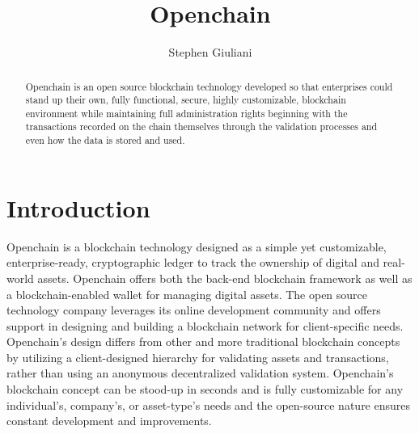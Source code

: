 
\title{Openchain}


\author{Stephen Giuliani}

\renewcommand{\shortauthors}{S. Giuliani}

\begin{abstract}
Openchain is an open source blockchain technology developed so that enterprises
could stand up their own, fully functional, secure, highly customizable,
blockchain environment while maintaining full administration rights beginning
with the transactions recorded on the chain themselves through the validation
processes and even how the data is stored and used.
\end{abstract}


\maketitle

\section{Introduction}
Openchain is a blockchain technology designed as a simple yet customizable,
enterprise-ready, cryptographic ledger to track the ownership of digital and
real-world assets. Openchain offers both the back-end blockchain framework as
well as a blockchain-enabled wallet for managing digital assets. The open
source technology company leverages its online development community and offers
support in designing and building a blockchain network for client-specific
needs. Openchain's design differs from other and more traditional blockchain
concepts by utilizing a client-designed hierarchy for validating assets and
transactions, rather than using an anonymous decentralized validation system.
Openchain's blockchain concept can be stood-up in seconds and is fully
customizable for any individual's, company's, or asset-type's needs and the
open-source nature ensures constant development and improvements.

